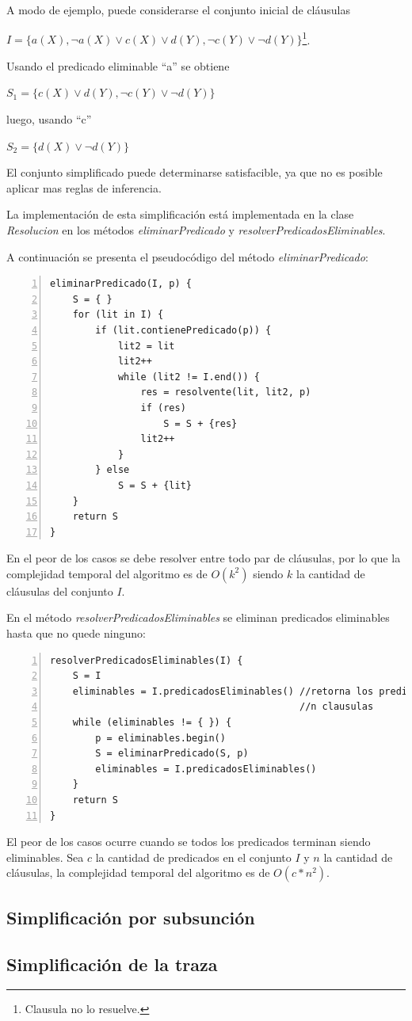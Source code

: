 \documentclass[a4paper,12pt]{article}
\begin{document}
A modo de ejemplo, puede considerarse el conjunto inicial de cláusulas 

\begin{center} 
$I = \{a(X),\lnot a(X) \lor c(X) \lor d(Y), \lnot c(Y) \lor \lnot d(Y)\}$\footnote{Clausula no lo resuelve.}.
\end{center}

Usando el predicado eliminable ``a'' se obtiene

\begin{center}
$S_1 = \{c(X) \lor d(Y), \lnot c(Y) \lor \lnot d(Y)\}$
\end{center}
luego, usando ``c''
\begin{center}
$S_2 = \{d(X) \lor \lnot d(Y)\}$
\end{center}
El conjunto simplificado puede determinarse satisfacible, ya que no es posible aplicar mas
reglas de inferencia.

La implementación de esta simplificación está implementada en la clase \emph{Resolucion} en los métodos
\emph{eliminarPredicado} y \emph{resolverPredicadosEliminables}.

A continuación se presenta el pseudocódigo del método \emph{eliminarPredicado}:
\begin{lstlisting}[caption=eliminarPredicado, frame=single, numbers=left, basicstyle=\tiny]
eliminarPredicado(I, p) {
    S = { }
    for (lit in I) {
        if (lit.contienePredicado(p)) {
            lit2 = lit
            lit2++
            while (lit2 != I.end()) {
                res = resolvente(lit, lit2, p)
                if (res)
                    S = S + {res}
                lit2++
            }
        } else
            S = S + {lit}
    }
    return S
}
\end{lstlisting}
En el peor de los casos se debe resolver entre todo par de cláusulas, por lo que la complejidad
temporal del algoritmo es de $O(k^2)$ siendo $k$ la cantidad de cláusulas del conjunto $I$.

En el método \emph{resolverPredicadosEliminables} se eliminan predicados eliminables hasta que no 
quede ninguno:
\begin{lstlisting}[caption=resolverPredicadosEliminables, frame=single, numbers=left, basicstyle=\tiny]
resolverPredicadosEliminables(I) {
    S = I
    eliminables = I.predicadosEliminables() //retorna los predicados eliminables O(n),
                                            //n clausulas
    while (eliminables != { }) {
        p = eliminables.begin()
        S = eliminarPredicado(S, p)
        eliminables = I.predicadosEliminables()
    }
    return S
}
\end{lstlisting}
El peor de los casos ocurre cuando se todos los predicados terminan siendo eliminables. Sea $c$ la cantidad
de predicados en el conjunto $I$ y $n$ la cantidad de cláusulas, la complejidad temporal del algoritmo es de
$O(c*n^2)$.
\subsection{Simplificación por subsunción}
\subsection{Simplificación de la traza}


\end{document}
